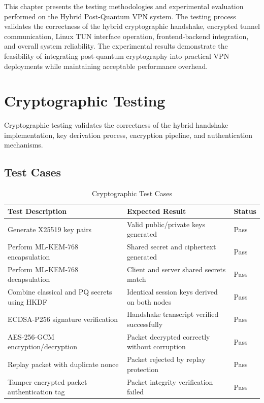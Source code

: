 
This chapter presents the testing methodologies and experimental evaluation performed on the Hybrid Post-Quantum VPN system. The testing process validates the correctness of the hybrid cryptographic handshake, encrypted tunnel communication, Linux TUN interface operation, frontend-backend integration, and overall system reliability. The experimental results demonstrate the feasibility of integrating post-quantum cryptography into practical VPN deployments while maintaining acceptable performance overhead.

\section{Cryptographic Testing}
\label{sec:crypto_testing}

Cryptographic testing validates the correctness of the hybrid handshake implementation, key derivation process, encryption pipeline, and authentication mechanisms.

\subsection{Test Cases}

\begin{table}[H]
\centering
\begin{tabularx}{\textwidth}{|X|X|l|}
\hline
\textbf{Test Description} & \textbf{Expected Result} & \textbf{Status} \\ \hline
Generate X25519 key pairs & Valid public/private keys generated & Pass \\ \hline
Perform ML-KEM-768 encapsulation & Shared secret and ciphertext generated & Pass \\ \hline
Perform ML-KEM-768 decapsulation & Client and server shared secrets match & Pass \\ \hline
Combine classical and PQ secrets using HKDF & Identical session keys derived on both nodes & Pass \\ \hline
ECDSA-P256 signature verification & Handshake transcript verified successfully & Pass \\ \hline
AES-256-GCM encryption/decryption & Packet decrypted correctly without corruption & Pass \\ \hline
Replay packet with duplicate nonce & Packet rejected by replay protection & Pass \\ \hline
Tamper encrypted packet authentication tag & Packet integrity verification failed & Pass \\ \hline
\end{tabularx}
\caption{Cryptographic Test Cases}
\end{table}

